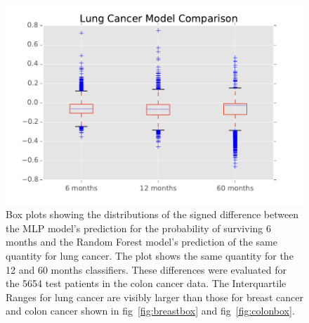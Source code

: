 \documentclass[a4paper,11pt]{article}
\begin{document}
\begin{figure}[tbp]
\centering 
\begin{center}
\includegraphics[width=.90\textwidth,origin=c]{lungbox.pdf}
\caption{\label{fig:lungbox} Box plots showing the distributions of the signed difference between the MLP model's prediction for the probability of surviving 6 months and the Random Forest model's prediction of the same quantity for lung cancer. The plot shows the same quantity for the 12 and 60 months classifiers. These differences were evaluated for the 5654 test patients in the colon cancer data. The Interquartile Ranges for lung cancer are visibly larger than those for breast cancer and colon cancer shown in fig~\ref{fig:breastbox} and fig~\ref{fig:colonbox}.}
\end{center}
\end{figure}




\end{document}
